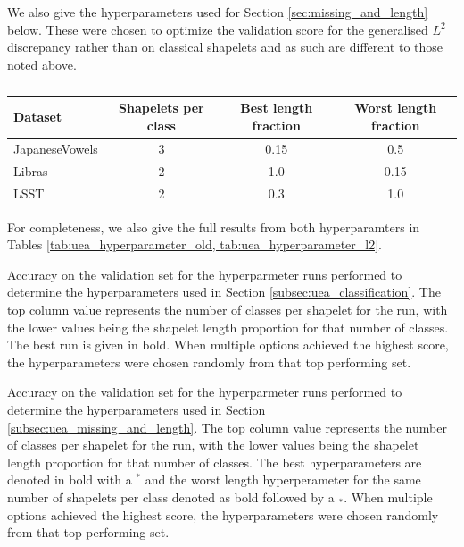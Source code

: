 \documentclass{article}
\theoremstyle{plain}
\theoremstyle{definition}
\begin{document}
	We also give the hyperparameters used for Section \ref{sec:missing_and_length} below. These were chosen to optimize the validation score for the generalised $L^2$ discrepancy rather than on classical shapelets and as such are different to those noted above.

	\begin{table}[ht]
		\caption{}
		\label{tab:uea_hyperparams_l2}
		\centering
		\begin{tabular}{lccc}
			\toprule
			Dataset & Shapelets per class & Best length fraction & Worst length fraction \\
			\midrule
			JapaneseVowels  & 3 & 0.15 & 0.5 \\
			Libras          & 2 & 1.0 & 0.15 \\
			LSST            & 2 & 0.3 & 1.0 \\
			\bottomrule
		\end{tabular}
	\end{table}

	For completeness, we also give the full results from both hyperparamters in Tables \ref{tab:uea_hyperparameter_old, tab:uea_hyperparameter_l2}.

	\begin{table}
		\centering
		\label{tab:uea_hyperparams_old_results}
		
		\caption{Accuracy on the validation set for the hyperparmeter runs performed to determine the hyperparameters used in Section \ref{subsec:uea_classification}. The top column value represents the number of classes per shapelet for the run, with the lower values being the shapelet length proportion for that number of classes. The best run is given in bold. When multiple options achieved the highest score, the hyperparameters were chosen randomly from that top performing set.}

		\bigskip\bigskip  %

		\centering
		\label{tab:uea_hyperparams_l2_results}
		
		\caption{Accuracy on the validation set for the hyperparmeter runs performed to determine the hyperparameters used in Section \ref{subsec:uea_missing_and_length}. The top column value represents the number of classes per shapelet for the run, with the lower values being the shapelet length proportion for that number of classes. The best hyperparameters are denoted in bold with a $^*$ and the worst length hyperperameter for the same number of shapelets per class denoted as bold followed by a $_*$. When multiple options achieved the highest score, the hyperparameters were chosen randomly from that top performing set.}
	\end{table}
\end{document}

